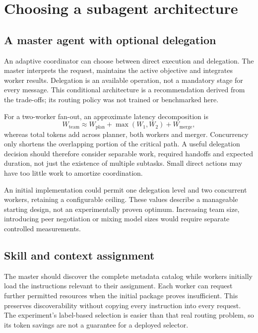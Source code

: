 \section{Choosing a subagent architecture}


\subsection{A master agent with optional delegation}
An adaptive coordinator can choose between direct execution and delegation. The master interprets the request, maintains the active objective and integrates worker results. Delegation is an available operation, not a mandatory stage for every message. This conditional architecture is a recommendation derived from the trade-offs; its routing policy was not trained or benchmarked here.

For a two-worker fan-out, an approximate latency decomposition is
\begin{equation}
W_{\mathrm{team}}\approx W_{\mathrm{plan}}+\max(W_1,W_2)+W_{\mathrm{merge}},
\end{equation}
whereas total tokens add across planner, both workers and merger. Concurrency only shortens the overlapping portion of the critical path. A useful delegation decision should therefore consider separable work, required handoffs and expected duration, not just the existence of multiple subtasks. Small direct actions may have too little work to amortize coordination.

An initial implementation could permit one delegation level and two concurrent workers, retaining a configurable ceiling. These values describe a manageable starting design, not an experimentally proven optimum. Increasing team size, introducing peer negotiation or mixing model sizes would require separate controlled measurements.

\subsection{Skill and context assignment}
The master should discover the complete metadata catalog while workers initially load the instructions relevant to their assignment. Each worker can request further permitted resources when the initial package proves insufficient. This preserves discoverability without copying every instruction into every request. The experiment's label-based selection is easier than that real routing problem, so its token savings are not a guarantee for a deployed selector.

